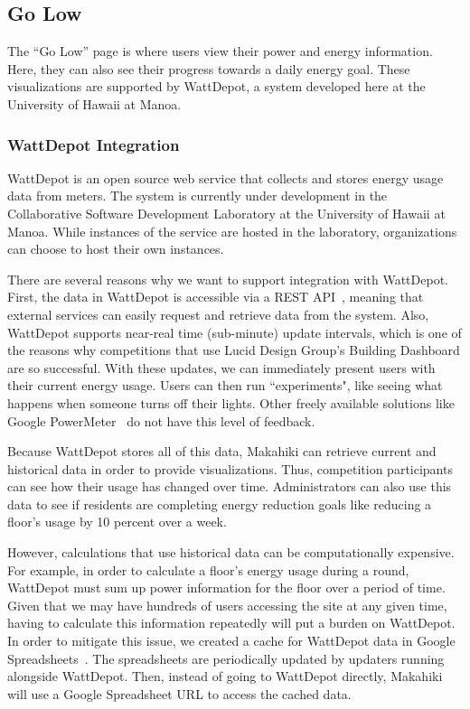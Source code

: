 \subsection{Go Low}
\label{makahiki:pages-golow}

The ``Go Low'' page is where users view their power and energy information.  Here, they can also see their progress towards a daily energy goal.  These visualizations are supported by WattDepot, a system developed here at the University of Hawaii at Manoa.

\subsubsection{WattDepot Integration}
\label{pages-golow:wattdepot}

WattDepot is an open source web service that collects and stores energy usage data from meters.  The system is currently under development in the Collaborative Software Development Laboratory at the University of Hawaii at Manoa.  While instances of the service are hosted in the laboratory, organizations can choose to host their own instances.

There are several reasons why we want to support integration with WattDepot.  First, the data in WattDepot is accessible via a REST API~\cite{wattdepot-rest}, meaning that external services can easily request and retrieve data from the system.  Also, WattDepot supports near-real time (sub-minute) update intervals, which is one of the reasons why competitions that use Lucid Design Group's Building Dashboard are so successful.  With these updates, we can immediately present users with their current energy usage.  Users can then run ``experiments", like seeing what happens when someone turns off their lights.  Other freely available solutions like Google PowerMeter~\cite{google-powermeter} do not have this level of feedback.

Because WattDepot stores all of this data, Makahiki can retrieve current and historical data in order to provide visualizations.  Thus, competition participants can see how their usage has changed over time.  Administrators can also use this data to see if residents are completing energy reduction goals like reducing a floor's usage by 10 percent over a week.

However, calculations that use historical data can be computationally expensive.  For example, in order to calculate a floor's energy usage during a round, WattDepot must sum up power information for the floor over a period of time.  Given that we may have hundreds of users accessing the site at any given time, having to calculate this information repeatedly will put a burden on WattDepot.  In order to mitigate this issue, we created a cache for WattDepot data in Google Spreadsheets~\cite{wattdepot-cloud-cache}.  The spreadsheets are periodically updated by updaters running alongside WattDepot.  Then, instead of going to WattDepot directly, Makahiki will use a Google Spreadsheet URL to access the cached data.

